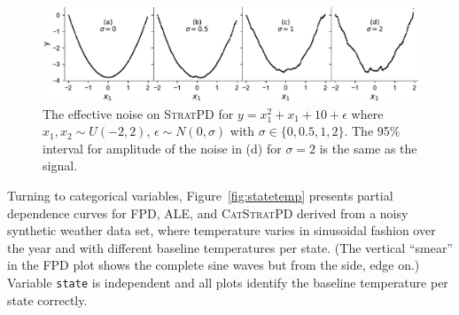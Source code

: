 \documentclass[smallextended]{svjour3}       %
\newcommand{\figref}[1]{Figure~\ref{#1}}
\newcommand{\spd}{\fontfamily{cmr}\textsc{\small StratPD}}
\newcommand{\cspd}{\fontfamily{cmr}\textsc{\small CatStratPD}}
\begin{document}
\begin{figure}[!htbp]
\begin{center}
\includegraphics[scale=0.45]{images/noise.pdf}\vspace{-2mm}\caption{\small The effective noise on \spd{} for $y = x_1^2 + x_1 + 10 + \epsilon$ where $x_1,x_2 \sim U(-2,2)$, $\epsilon \sim N(0,\sigma)$ with $\sigma \in \{0,0.5,1,2\}$. The 95\% interval for amplitude of the noise in (d) for $\sigma=2$ is the same as the signal.}
\label{fig:noise}
\end{center}
\end{figure}

Turning to categorical variables, \figref{fig:statetemp} presents partial dependence curves for FPD, ALE, and \cspd{} derived from a noisy synthetic weather data set, where temperature varies in sinusoidal fashion over the year and with different baseline temperatures per state. (The vertical ``smear'' in the FPD plot shows the complete sine waves but from the side, edge on.)  Variable {\tt\small state} is independent and all plots identify the baseline temperature per state correctly.
\end{document}
